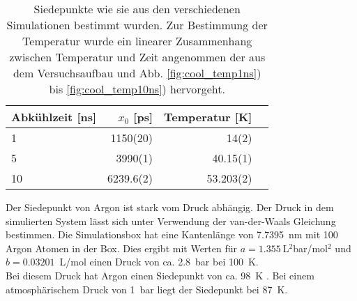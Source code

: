 \begin{table}
\centering
\caption{Siedepunkte wie sie aus den verschiedenen Simulationen bestimmt wurden. Zur Bestimmung der Temperatur wurde ein linearer Zusammenhang zwischen Temperatur und Zeit angenommen der aus dem Versuchsaufbau und Abb. \ref{fig:cool_temp1ns}) bis \ref{fig:cool_temp10ns}) hervorgeht.}\label{tab:siedepunkt}
\begin{tabular}{l|rrr}
Abkühlzeit [ns] & $x_0$ [ps] & Temperatur [K] \\ \hline
1 & 1150(20) &  14(2) \\
5 & 3990(1) & 40.15(1) \\
10 & 6239.6(2) & 53.203(2) \\
\end{tabular}
\end{table}

Der Siedepunkt von Argon ist stark vom Druck abhängig. Der Druck in dem simulierten System lässt sich unter Verwendung der van-der-Waals Gleichung bestimmen. Die Simulationsbox hat eine Kantenlänge von 7.7395~nm mit 100 Argon Atomen in der Box.
Dies ergibt mit Werten für $a = 1.355~$L$^2$bar/mol$^2$ und $b=0.03201$~L/mol \cite{chemicalcrc} einen Druck von ca. 2.8~bar bei 100~K.
\\ \noindent
Bei diesem Druck hat Argon einen Siedepunkt von ca. 98~K \cite{phasediagram}. Bei einem atmosphärischem Druck von 1~bar liegt der Siedepunkt bei 87~K.


%
